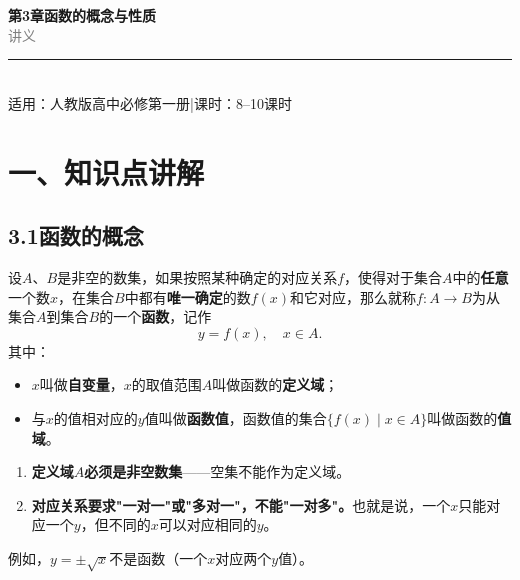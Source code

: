 \documentclass[12pt, a4paper]{ctexart}
\begin{document}
\begin{center}
{\Huge\bfseries\textcolor{mainblue}{第3章\quad 函数的概念与性质}}\\[12pt]
{\Large\textcolor{gray}{讲\quad 义}}\\[8pt]
\rule{0.6\textwidth}{1pt}\\[8pt]
{\normalsize 适用：人教版\quad 高中必修第一册\quad |\quad 课时：8--10课时}
\end{center}
\vspace{10pt}

\section*{\textcolor{mainblue}{一、知识点讲解}}

\subsection*{3.1\quad 函数的概念}

\begin{knowledgebox}[函数的定义]
设$A$、$B$是非空的数集，如果按照某种确定的对应关系$f$，使得对于集合$A$中的\textbf{任意}一个数$x$，在集合$B$中都有\textbf{唯一确定}的数$f(x)$和它对应，那么就称$f: A\to B$为从集合$A$到集合$B$的一个\textbf{函数}，记作
\[y = f(x),\quad x \in A.\]
其中：
\begin{itemize}[leftmargin=2em]
  \item $x$叫做\textbf{自变量}，$x$的取值范围$A$叫做函数的\textbf{定义域}；
  \item 与$x$的值相对应的$y$值叫做\textbf{函数值}，函数值的集合$\{f(x)\mid x\in A\}$叫做函数的\textbf{值域}。
\end{itemize}
\end{knowledgebox}

\begin{warnbox}
\begin{enumerate}[leftmargin=2em]
  \item \textbf{定义域$A$必须是非空数集}——空集不能作为定义域。
  \item \textbf{对应关系要求"一对一"或"多对一"，不能"一对多"。}也就是说，一个$x$只能对应一个$y$，但不同的$x$可以对应相同的$y$。
\end{enumerate}
例如，$y=\pm\sqrt{x}$不是函数（一个$x$对应两个$y$值）。
\end{warnbox}
\end{document}
